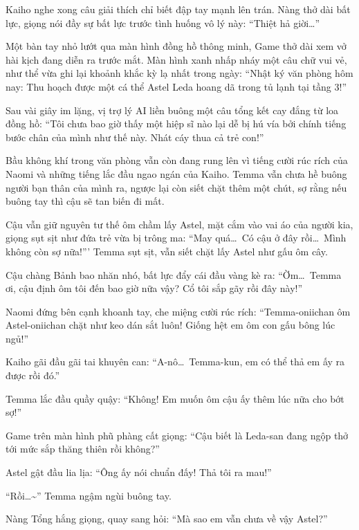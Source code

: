 \documentclass[../main.tex]{subfiles}
\begin{document}

Kaiho nghe xong câu giải thích chỉ biết đập tay mạnh lên trán. Nàng thở dài bất lực, giọng nói đầy sự bất lực trước tình huống vô lý này: ``Thiệt hả giời\dots''

Một bàn tay nhỏ lướt qua màn hình đồng hồ thông minh, Game thở dài xem vở hài kịch đang diễn ra trước mắt. Màn hình xanh nhấp nháy một câu chữ vui vẻ, như thể vừa ghi lại khoảnh khắc kỳ lạ nhất trong ngày: ``Nhật ký văn phòng hôm nay: Thu hoạch được một cá thể Astel Leda hoang dã trong tủ lạnh tại tầng 3!''

Sau vài giây im lặng, vị trợ lý AI liền buông một câu tổng kết cay đắng từ loa đồng hồ: ``Tôi chưa bao giờ thấy một hiệp sĩ nào lại dễ bị hú vía bởi chính tiếng bước chân của mình như thế này. Nhát cáy thua cả trẻ con!''

\omk

Bầu không khí trong văn phòng vẫn còn đang rung lên vì tiếng cười rúc rích của Naomi và những tiếng lắc đầu ngao ngán của Kaiho. Temma vẫn chưa hề buông người bạn thân của mình ra, ngược lại còn siết chặt thêm một chút, sợ rằng nếu buông tay thì cậu sẽ tan biến đi mất.

Cậu vẫn giữ nguyên tư thế ôm chầm lấy Astel, mặt cắm vào vai áo của người kia, giọng sụt sịt như đứa trẻ vừa bị trông ma: ``May quá\dots\ Có cậu ở đây rồi\dots\ Mình không còn sợ nữa!''' Temma sụt sịt, vẫn siết chặt lấy Astel như gấu ôm cây.

Cậu chàng Bảnh bao nhăn nhó, bất lực đẩy cái đầu vàng kè ra: ``Ờm\dots\ Temma ơi, cậu định ôm tôi đến bao giờ nữa vậy? Cổ tôi sắp gãy rồi đây này!''

Naomi đứng bên cạnh khoanh tay, che miệng cười rúc rích: ``Temma-oniichan ôm Astel-oniichan chặt như keo dán sắt luôn! Giống hệt em ôm con gấu bông lúc ngủ!''

Kaiho gãi đầu gãi tai khuyên can: ``A-nô\dots\ Temma-kun, em có thể thả em ấy ra được rồi đó.''

Temma lắc đầu quầy quậy: ``Không! Em muốn ôm cậu ấy thêm lúc nữa cho bớt sợ!''

Game trên màn hình phũ phàng cất giọng: ``Cậu biết là Leda-san đang ngộp thở tới mức sắp thăng thiên rồi không?''

Astel gật đầu lia lịa: ``Ông ấy nói chuẩn đấy! Thả tôi ra mau!''

``Rồi\dots\~{}'' Temma ngậm ngùi buông tay.

Nàng Tổng hắng giọng, quay sang hỏi: ``Mà sao em vẫn chưa về vậy Astel?''
\end{document}
